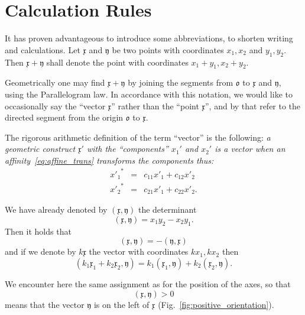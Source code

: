 \documentclass[11pt]{book} \usepackage{amssymb}
\newcommand{\myvec}[1]{\mathfrak{#1}}
\begin{document}
\section{Calculation Rules}
\label{section:calculation_rules}
It has proven advantageous to introduce some abbreviations, to shorten
writing and calculations. Let $\myvec{x}$ and $\myvec{y}$ be two points with
coordinates $x_1,x_2$ and $y_1,y_2$. Then $\myvec{x}+\myvec{y}$ shall denote
the point with coordinates $x_1+y_1,x_2+y_2$. 

Geometrically one may find $\myvec{x}+\myvec{y}$ by joining the segments from
$\myvec{o}$ to $\myvec{x}$ and $\myvec{y}$, using the Parallelogram law. In
accordance with this notation, we would like to occasionally say the
``vector $\myvec{x}$'' rather than the ``point $\myvec{x}$'', and by that refer
to the directed segment from the origin $\myvec{o}$ to $\myvec{x}$.

The rigorous arithmetic definition of the term ``vector'' is the following:
{\em a geometric construct $\myvec{x}'$ with the ``components'' $x_1'$ and
$x_2'$ is a vector when an affinity~\eqref{eq:affine_trans} transforms the
components thus:}
\begin{equation}
  \label{eq:vector_def}
  \begin{array}{rcl}
    {x'_1}^* &=& c_{11}x'_1+c_{12}x'_2\\
    {x'_2}^* &=& c_{21}x'_1+c_{22}x'_2.
  \end{array}  
\end{equation}

We have already denoted by $(\myvec{x},\myvec{y})$ the determinant
\begin{equation}
  \label{eq:det_redefined}
  (\myvec{x},\myvec{y})=x_1y_2-x_2y_1.
\end{equation}
Then it holds that
\begin{equation}
  \label{eq:det_antisymmetric}
  (\myvec{x},\myvec{y})=-(\myvec{y},\myvec{x})
\end{equation}
and if we denote by $k\myvec{x}$ the vector with coordinates $kx_1,kx_2$ then
\begin{equation}
  \label{eq:det_bilinear}
  (k_1\myvec{x}_1+k_2\myvec{x}_2,\myvec{y})=k_1(\myvec{x}_1,\myvec{y})+k_2(\myvec{x}_2,\myvec{y}).
\end{equation}

We encounter here the same assignment as for the position of the axes, so that
\begin{equation}
  (\myvec{x},\myvec{y}) > 0
\end{equation}
means that the vector $\myvec{y}$ is on the left of $\myvec{x}$ 
(Fig.~\ref{fig:positive_orientation}).
\end{document}
